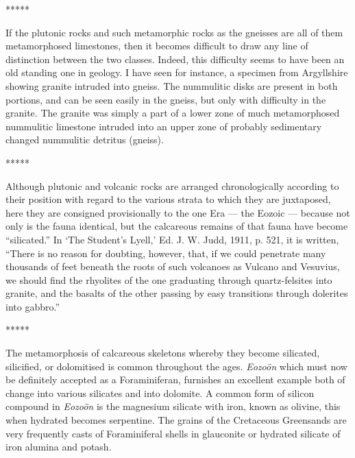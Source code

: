 \documentclass[a4paper, 12pt, oneside]{article}
\begin{document}
\centerline{*\hspace{15mm}*\hspace{15mm}*\hspace{15mm}*\hspace{15mm}*}
\bigskip

If the plutonic rocks and such metamorphic rocks as the gneisses are all of them metamorphosed limestones, then it becomes difficult to draw any line of distinction between the two classes. Indeed, this difficulty seems to have been an old standing one in geology. I have seen for instance, a specimen from Argyllshire showing granite intruded into gneiss. The nummulitic disks are present in both portions, and can be seen easily in the gneiss, but only with difficulty in the granite. The granite was simply a part of a lower zone of much metamorphosed nummulitic limestone intruded into an upper zone of probably sedimentary changed nummulitic detritus (gneiss).

\centerline{*\hspace{15mm}*\hspace{15mm}*\hspace{15mm}*\hspace{15mm}*}
\bigskip

Although plutonic and volcanic rocks are arranged chronologically according to their position with regard to the various strata to which they are juxtaposed, here they are consigned provisionally to the one Era --- the Eozoic --- because not only is the fauna identical, but the calcareous remains of that fauna have become ``silicated.'' In `The Student's Lyell,' Ed. J. W. Judd, 1911, p. 521, it is written, ``There is no reason for doubting, however, that, if we could penetrate many thousands of feet beneath the roots of such volcanoes as Vulcano and Vesuvius, we should find the rhyolites of the one graduating through quartz-felsites into granite, and the basalts of the other passing by easy transitions through dolerites into gabbro.''

\centerline{*\hspace{15mm}*\hspace{15mm}*\hspace{15mm}*\hspace{15mm}*}
\bigskip

The metamorphosis of calcareous skeletons whereby they become silicated, silicified, or dolomitised is common throughout the ages. \emph{Eozoön} which must now be definitely accepted as a Foraminiferan, furnishes an excellent example both of change into various silicates and into dolomite. A common form of silicon compound in \emph{Eozoön} is the magnesium silicate with iron, known as olivine, this when hydrated becomes serpentine. The grains of the Cretaceous Greensands are very frequently casts of Foraminiferal shells in glauconite or hydrated silicate of iron alumina and potash.
\end{document}

